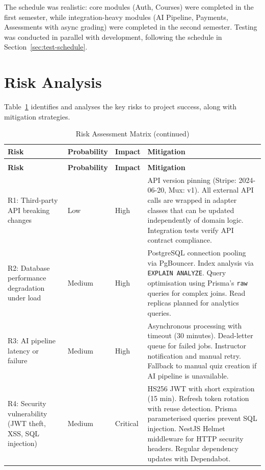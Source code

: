 The schedule was realistic: core modules (Auth, Courses) were completed in the first semester, while integration-heavy modules (AI Pipeline, Payments, Assessments with async grading) were completed in the second semester. Testing was conducted in parallel with development, following the schedule in Section~\ref{sec:test-schedule}.

\section{Risk Analysis}
\label{sec:app-risk}

Table~\ref{tab:app-risk} identifies and analyses the key risks to project success, along with mitigation strategies.

\begin{longtable}{p{1.8cm}p{1.8cm}p{1.8cm}p{\dimexpr\textwidth-6.4cm\relax}}
  \caption{Risk Assessment Matrix\label{tab:app-risk}} \\
  \toprule
  \textbf{Risk} & \textbf{Probability} & \textbf{Impact} & \textbf{Mitigation} \\
  \midrule
  \endfirsthead
  \caption*{Risk Assessment Matrix (continued)} \\
  \toprule
  \textbf{Risk} & \textbf{Probability} & \textbf{Impact} & \textbf{Mitigation} \\
  \midrule
  \endhead
  \midrule
  \endfoot
  R1: Third-party API breaking changes & Low & High & API version pinning (Stripe: 2024-06-20, Mux: v1). All external API calls are wrapped in adapter classes that can be updated independently of domain logic. Integration tests verify API contract compliance. \\
  \addlinespace
  R2: Database performance degradation under load & Medium & High & PostgreSQL connection pooling via PgBouncer. Index analysis via \texttt{EXPLAIN ANALYZE}. Query optimisation using Prisma's \texttt{raw} queries for complex joins. Read replicas planned for analytics queries. \\
  \addlinespace
  R3: AI pipeline latency or failure & Medium & High & Asynchronous processing with timeout (30 minutes). Dead-letter queue for failed jobs. Instructor notification and manual retry. Fallback to manual quiz creation if AI pipeline is unavailable. \\
  \addlinespace
  R4: Security vulnerability (JWT theft, XSS, SQL injection) & Medium & Critical & HS256 JWT with short expiration (15 min). Refresh token rotation with reuse detection. Prisma parameterised queries prevent SQL injection. NestJS Helmet middleware for HTTP security headers. Regular dependency updates with Dependabot. \\

\end{longtable}
